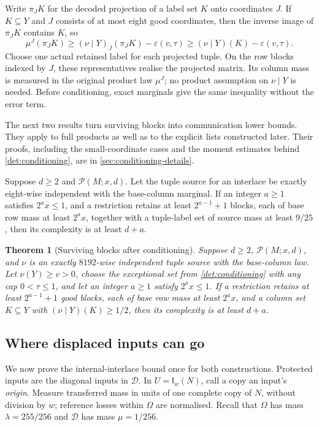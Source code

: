 \documentclass[11pt]{article} \usepackage[utf8]{inputenc}
\theoremstyle{plain} \newtheorem{theorem}{Theorem}[section]
\theoremstyle{definition} \newaliascnt{definition}{theorem}
\newcommand{\Int}[2]{\mathsf{I}_{#1}(#2)}
\newcommand{\RP}[3]{\mathcal{P}(#1;#2,#3)}
\begin{document}
Write $\pi_JK$ for the decoded projection of a label set $K$ onto coordinates
$J$. If $K\subseteq Y$ and $J$ consists of at most eight good coordinates,
then the inverse image of $\pi_JK$ contains $K$, so
\[
\mu^J(\pi_JK)
\ge(\nu\mid Y)_J(\pi_JK)-\varepsilon(v,\tau)
\ge(\nu\mid Y)(K)-\varepsilon(v,\tau).
\]
Choose one actual retained label for each projected tuple. On the row blocks
indexed by $J$, these representatives realise the projected matrix. Its
column mass is measured in the original product law $\mu^J$; no product
assumption on $\nu\mid Y$ is needed. Before conditioning, exact marginals
give the same inequality without the error term.

The next two results turn surviving blocks into communication lower bounds.
They apply to full products as well as to the explicit lists constructed
later. Their proofs, including the small-coordinate cases and the moment
estimates behind \cref{det:conditioning}, are in
\cref{sec:conditioning-details}.

\begin{lemma}\label{det:exact}
Suppose $d\ge2$ and $\RP{M}{x}{d}$. Let the tuple source for an interlace be
exactly eight-wise independent with the base-column marginal. If an integer
$a\ge1$ satisfies $2^ax\le1$, and a restriction retains at least
$2^{a-1}+1$ blocks, each of base row mass at least $2^ax$, together with a
tuple-label set of source mass at least $9/25$, then its complexity is at
least $d+a$.
\end{lemma}

\begin{theorem}[Surviving blocks after conditioning]\label{det:rareboost}
Suppose $d\ge2$, $\RP{M}{x}{d}$, and $\nu$ is an exactly $8192$-wise
independent tuple source with the base-column law. Let $\nu(Y)\ge v>0$,
choose the exceptional set from \cref{det:conditioning} with any cap
$0<\tau\le1$, and let an integer $a\ge1$ satisfy $2^ax\le1$. If a restriction
retains at least $2^{a-1}+1$ good blocks, each of base row mass at least
$2^ax$, and a column set $K\subseteq Y$ with $(\nu\mid Y)(K)\ge1/2$, then
its complexity is at least $d+a$.
\end{theorem}


\subsection{Where displaced inputs can go}\label{sec:internal-interlace}

We now prove the internal-interlace bound once for both constructions.
Protected inputs are the diagonal inputs in $\mathcal D$. In
$U=\Int{w}{N}$, call a copy an input's \emph{origin}. Measure transferred
mass in units of one complete copy of $N$, without division by $w$;
reference losses within $\Omega$ are normalised. Recall that $\Omega$ has
mass $\lambda=255/256$ and $\mathcal D$ has mass $\mu=1/256$.
\end{document}

